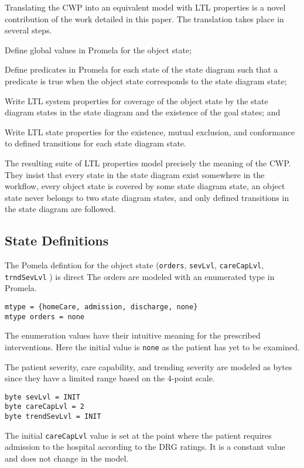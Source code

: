 Translating the CWP into an equivalent model with LTL properties is a novel contribution of the work detailed in this paper. The translation takes place in several steps.
\begin{compactenum}
  \item Define global values in Promela for the object state;
  \item Define predicates in Promela for each state of the state diagram such that a predicate is true when the object state corresponds to the state diagram state;
  \item Write LTL system properties for coverage of the object state by the state diagram states in the state diagram and the existence of the goal states; and
  \item Write LTL state properties for the existence, mutual exclusion, and conformance to defined transitions for each state diagram state.
\end{compactenum}
The resulting suite of LTL properties model precisely the meaning of the CWP. They insist that every state in the state diagram exist somewhere in the workflow, every object state is covered by some state diagram state, an object state never belongs to two state diagram states, and only defined transitions in the state diagram are followed.

\subsection{State Definitions}
The Pomela defintion for the object state (\texttt{orders}, \texttt{sevLvl}, \texttt{careCapLvl}, \texttt{trndSevLvl} )  is direct The orders are modeled with an enumerated type in Promela.
%
{\small
\begin{lstlisting}[style=myPromela]
mtype = {homeCare, admission, discharge, none}
mtype orders = none
\end{lstlisting}
}
%
\noindent The enumeration values have their intuitive meaning for the prescribed interventions. Here the initial value is \texttt{none} as the patient has yet to be examined.

The patient severity, care capability, and trending severity are modeled as bytes since they have a limited range based on the 4-point scale.
%
{\small
\begin{lstlisting}[style=myPromela]
byte sevLvl = INIT
byte careCapLvl = 2
byte trendSevLvl = INIT
\end{lstlisting}
}
%
\noindent The initial \texttt{careCapLvl} value is set at the point where the patient requires admission to the hospital according to the DRG ratings. It is a constant value and does not change in the model.

